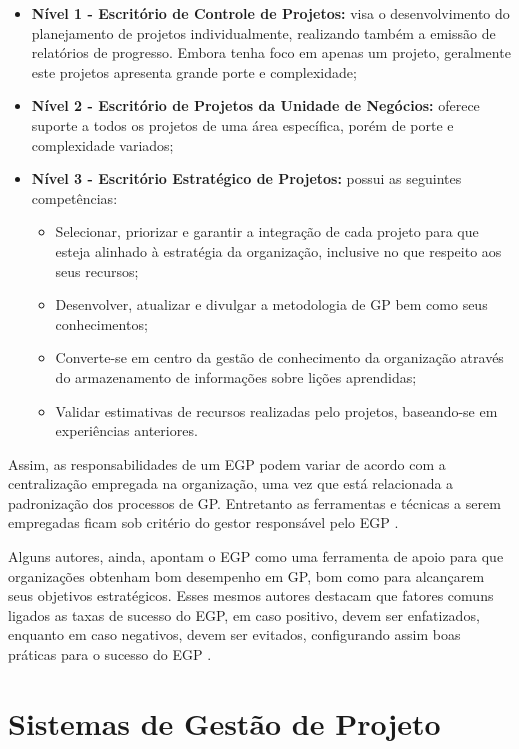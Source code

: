   \begin{itemize}
    \item \textbf{Nível 1 - Escritório de Controle de Projetos:} visa o desenvolvimento do planejamento de projetos individualmente, realizando também a emissão de relatórios de progresso. Embora tenha foco em apenas um projeto, geralmente este projetos apresenta grande porte e complexidade;
    \item \textbf{Nível 2 - Escritório de Projetos da Unidade de Negócios:} oferece suporte a todos os projetos de uma área específica, porém de porte e complexidade variados;
    \item \textbf{Nível 3 - Escritório Estratégico de Projetos:} possui as seguintes competências:
    \begin{itemize}
      \item Selecionar, priorizar e garantir a integração de cada projeto para que esteja alinhado à estratégia da organização, inclusive no que respeito aos seus recursos;
      \item Desenvolver, atualizar e divulgar a metodologia de GP bem como seus conhecimentos;
      \item Converte-se em centro da gestão de conhecimento da organização através do armazenamento de informações sobre lições aprendidas;
      \item Validar estimativas de recursos realizadas pelo projetos, baseando-se em experiências anteriores.
    \end{itemize}
  \end{itemize}

  Assim, as responsabilidades de um EGP podem variar de acordo com a centralização empregada na organização, uma vez que está relacionada a padronização dos processos de GP. Entretanto as ferramentas e técnicas a serem empregadas ficam sob critério do gestor responsável pelo EGP \cite{pmiguide2013}.

  Alguns autores, ainda, apontam o EGP como uma ferramenta de apoio para que organizações obtenham bom desempenho em GP, bom como para alcançarem seus objetivos estratégicos. Esses mesmos autores destacam que fatores comuns ligados as taxas de sucesso do EGP, em caso positivo, devem ser enfatizados, enquanto em caso negativos, devem ser evitados, configurando assim boas práticas para o sucesso do EGP \cite{andersen2007benchmarking}.

\section{Sistemas de Gestão de Projeto}

